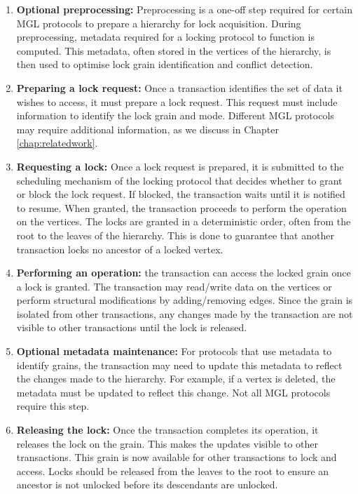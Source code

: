 \begin{enumerate}
    \item \textbf{Optional preprocessing:} Preprocessing is a one-off step required for certain MGL protocols to prepare a hierarchy for lock acquisition. During preprocessing, metadata required for a locking protocol to function is computed. This metadata, often stored in the vertices of the hierarchy, is then used to optimise lock grain identification and conflict detection. 
    \item \textbf{Preparing a lock request:} Once a transaction identifies the set of data it wishes to access, it must prepare a lock request. This request must include information to identify the lock grain and mode. Different MGL protocols may require additional information, as we discuss in Chapter \ref{chap:relatedwork}.
    \item \textbf{Requesting a lock:} Once a lock request is prepared, it is submitted to the scheduling mechanism of the locking protocol that decides whether to grant or block the lock request. If blocked, the transaction waits until it is notified to resume. When granted, the transaction proceeds to perform the operation on the vertices. The locks are granted in a deterministic order, often from the root to the leaves of the hierarchy. This is done to guarantee that another transaction locks no ancestor of a locked vertex. 
    \item \textbf{Performing an operation:} the transaction can access the locked grain once a lock is granted. The transaction may read/write data on the vertices or perform structural modifications by adding/removing edges. Since the grain is isolated from other transactions, any changes made by the transaction are not visible to other transactions until the lock is released.
    \item \textbf{Optional metadata maintenance:} For protocols that use metadata to identify grains, the transaction may need to update this metadata to reflect the changes made to the hierarchy. For example, if a vertex is deleted, the metadata must be updated to reflect this change. Not all MGL protocols require this step.
    \item \textbf{Releasing the lock:} Once the transaction completes its operation, it releases the lock on the grain. This makes the updates visible to other transactions. This grain is now available for other transactions to lock and access. Locks should be released from the leaves to the root to ensure an ancestor is not unlocked before its descendants are unlocked.
\end{enumerate}



